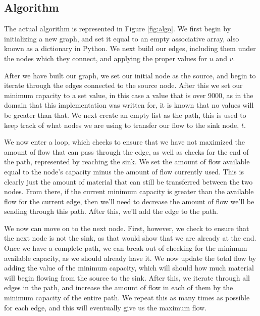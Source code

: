 \documentclass[conference]{IEEEtran}
\begin{document}
\subsection{Algorithm}
The actual algorithm is represented in Figure \ref{fig:algo}. We first begin by initializing a new graph, and set it equal to an empty associative array, also known as a dictionary in Python. We next build our edges, including them under the nodes which they connect, and applying the proper values for $u$ and $v$. 

After we have built our graph, we set our initial node as the source, and begin to iterate through the edges connected to the source node. After this we set our minimum capacity to a set value, in this case a value that is over 9000, as in the domain that this implementation was written for, it is known that no values will be greater than that. We next create an empty list as the path, this is used to keep track of what nodes we are using to transfer our flow to the sink node, $t$.

We now enter a loop, which checks to ensure that we have not maximized the amount of flow that can pass through the edge, as well as checks for the end of the path, represented by reaching the sink. We set the amount of flow available equal to the node's capacity minus the amount of flow currently used. This is clearly just the amount of material that can still be transferred between the two nodes. From there, if the current minimum capacity is greater than the available flow for the current edge, then we'll need to decrease the amount of flow we'll be sending through this path. After this, we'll add the edge to the path. 

We now can move on to the next node. First, however, we check to ensure that the next node is not the sink, as that would show that we are already at the end. Once we have a complete path, we can break out of checking for the minimum available capacity, as we should already have it. We now update the total flow by adding the value of the minimum capacity, which will should how much material will begin flowing from the source to the sink. After this, we iterate through all edges in the path, and increase the amount of flow in each of them by the minimum capacity of the entire path. We repeat this as many times as possible for each edge, and this will eventually give us the maximum flow.
\end{document}
